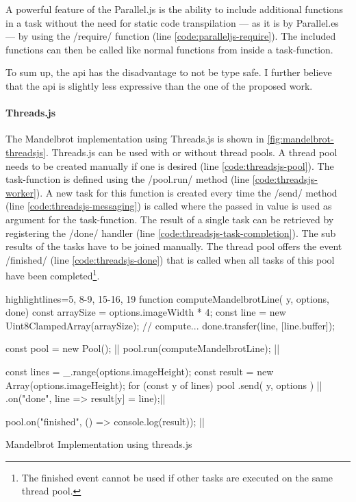 A powerful feature of the Parallel.js is the ability to include additional functions in a task without the need for static code transpilation --- as it is by Parallel.es --- by using the \javascriptinline/require/ function (line \ref{code:paralleljs-require}). The included functions can then be called like normal functions from inside a task-function. 

To sum up, the api has the disadvantage to not be type safe. I further believe that the api is slightly less expressive than the one of the proposed work.

\paragraph{Threads.js}
 The Mandelbrot implementation using Threads.js is shown in \cref{fig:mandelbrot-threadsjs}. Threads.js can be used with or without thread pools. A thread pool needs to be created manually if one is desired (line \ref{code:threadsjs-pool}). The task-function is defined using the \javascriptinline/pool.run/ method (line \ref{code:threadsjs-worker}). A new task for this function is created every time the \javascriptinline/send/ method (line \ref{code:threadsjs-messaging}) is called where the passed in value is used as argument for the task-function. The result of a single task can be retrieved by registering the \javascriptinline/done/ handler (line \ref{code:threadsjs-task-completion}). The sub results of the tasks have to be joined manually. The thread pool offers the event \javascriptinline/finished/ (line \ref{code:threadsjs-done}) that is called when all tasks of this pool have been completed\footnote{The finished event cannot be used if other tasks are executed on the same thread pool.}.

\begin{listing}
	\begin{javascriptcode*}{highlightlines={5, 8-9, 15-16, 19}}
function computeMandelbrotLine({ y, options}, done) {
	const arraySize = options.imageWidth * 4;
	const line = new Uint8ClampedArray(arraySize);
	// compute...
	done.transfer(line, [line.buffer]);
}

const pool = new Pool(); |$\label{code:threadsjs-pool}$|
pool.run(computeMandelbrotLine); |$\label{code:threadsjs-worker}$|

const lines = _.range(options.imageHeight);
const result = new Array(options.imageHeight);
for (const y of lines) {
	pool
		.send({ y, options }) |$\label{code:threadsjs-messaging}$|
		.on("done", line => result[y] = line);|$\label{code:threadsjs-task-completion}$|
}

pool.on("finished", () => console.log(result)); |$\label{code:threadsjs-done}$|
\end{javascriptcode*}
\caption{Mandelbrot Implementation using threads.js}
\label{fig:mandelbrot-threadsjs}
\end{listing}



